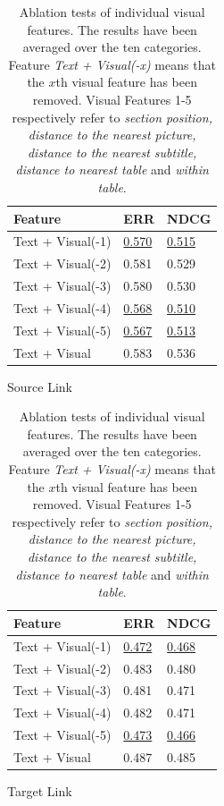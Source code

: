\begin{table}[t]
    \begin{subtable}[h]{0.45\textwidth}
        \centering
        \begin{tabular}{l | l | l}
        Feature & ERR & NDCG \\
        \hline \hline
        Text + Visual(-1) & \underline{0.570} & \underline{0.515} \\
        Text + Visual(-2) & 0.581 & 0.529 \\
        Text + Visual(-3) & 0.580 & 0.530 \\
        Text + Visual(-4) & \underline{0.568} & \underline{0.510} \\
        Text + Visual(-5) & \underline{0.567} & \underline{0.513} \\
        Text + Visual     & 0.583 & 0.536 \\
       \end{tabular}
       \caption{Source Link}
       \label{table_cmp9}
    \end{subtable}
    \hfill
    \begin{subtable}[h]{0.45\textwidth}
        \centering
        \begin{tabular}{l | l | l}
        Feature & ERR & NDCG \\
        \hline \hline
        Text + Visual(-1) & \underline{0.472} & \underline{0.468} \\
        Text + Visual(-2) & 0.483 & 0.480 \\
        Text + Visual(-3) & 0.481 & 0.471 \\
        Text + Visual(-4) & 0.482 & 0.471 \\
        Text + Visual(-5) & \underline{0.473} & \underline{0.466} \\
        Text + Visual     & 0.487 & 0.485 \\
       \end{tabular}
        \caption{Target Link}
        \label{table_cmp10}
     \end{subtable}
     \caption{Ablation tests of individual visual features. The results have been averaged over the ten categories. Feature \emph{Text + Visual(-x)} means that the $x$th visual feature has been removed. Visual Features 1-5 respectively refer to \textit{section position, distance to the nearest picture, distance to the nearest subtitle, distance to nearest table} and \textit{within table}.}
     \label{table_cmp11}
\end{table}

